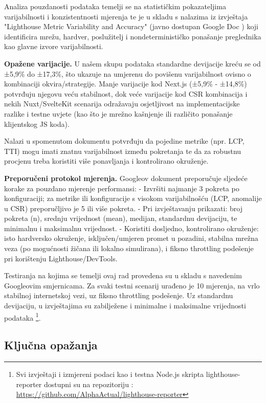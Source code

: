 Analiza pouzdanosti podataka temelji se na statističkim pokazateljima varijabilnosti i konzistentnosti mjerenja te je u skladu s nalazima iz izvještaja "Lighthouse Metric Variability and Accuracy" (javno dostupan Google Doc \cite{lh_variability2025}) koji identificira mrežu, hardver, poslužitelj i nondeterminističko ponašanje preglednika kao glavne izvore varijabilnosti.

\textbf{Opažene varijacije.} U našem skupu podataka standardne devijacije kreću se od ±5,9\% do ±17,3\%, što ukazuje na umjerenu do povišenu varijabilnost ovisno o kombinaciji okvira/strategije. Manje varijacije kod Next.js (±5,9\% - ±14,8\%) potvrđuju njegovu veću stabilnost, dok veće varijacije kod CSR kombinacija i nekih Nuxt/SvelteKit scenarija odražavaju osjetljivost na implementacijske razlike i testne uvjete (kao što je mrežno kašnjenje ili različito ponašanje klijentskog JS koda).

Nalazi u spomenutom dokumentu potvrđuju da pojedine metrike (npr. LCP, TTI) mogu imati znatnu varijabilnost između pokretanja te da za robustnu procjenu treba koristiti više ponavljanja i kontrolirano okruženje.

\textbf{Preporučeni protokol mjerenja.}
Googleov dokument \cite{lh_variability2025} preporučuje sljedeće korake za pouzdano mjerenje performansi:
- Izvršiti najmanje 3 pokreta po konfiguraciji; za metrike ili konfiguracije s visokom varijabilnošću (LCP, anomalije u CSR) preporučljivo je 5 ili više pokreta.
- Pri izvještavanju prikazati: broj pokreta (n), srednju vrijednost (mean), medijan, standardnu devijaciju, te minimalnu i maksimalnu vrijednost.
- Koristiti dosljedno, kontrolirano okruženje: isto hardversko okruženje, isključen/umjeren promet u pozadini, stabilna mrežna veza (po mogućnosti žičana ili lokalno simulirana), i fiksno throttling podešenje pri korištenju Lighthouse/DevTools.

Testiranja na kojima se temelji ovaj rad  provedena su u skladu s navedenim Googleovim smjernicama. Za svaki testni scenarij urađeno je 10 mjerenja, na vrlo stabilnoj internetskoj vezi, uz fiksno throttling podešenje. Uz standardnu devijaciju, u izvještajima su zabilježene i minimalne i maksimalne vrijednosti podataka \footnote{Svi izvještaji i izmjereni podaci kao i testna Node.js skripta lighthouse-reporter dostupni su na repozitoriju : \url{https://github.com/AlphaActual/lighthouse-reporter}}.


\subsection{Ključna opažanja}

